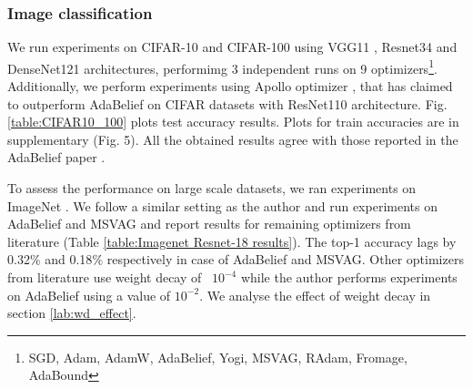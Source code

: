 
\subsubsection{Image classification}
\label{lab:Image_classification}
We run experiments on CIFAR-10 and CIFAR-100 using VGG11 \cite{VGG}, Resnet34 \cite{Resnet} and DenseNet121 \cite{Densenet} architectures, performimg 3 independent runs on 9 optimizers\footnote{\label{fnote:optim_list}SGD, Adam, AdamW, AdaBelief, Yogi, MSVAG, RAdam, Fromage, AdaBound}. Additionally, we perform experiments using Apollo optimizer \cite{Apollo}, that has claimed to outperform AdaBelief on CIFAR datasets with ResNet110 architecture. Fig. \ref{table:CIFAR10_100} plots test accuracy results. Plots for train accuracies are in supplementary (Fig. 5). All the obtained results agree with those reported in the AdaBelief paper \cite{zhuang_adabelief_2020}. 

To assess the performance on large scale datasets, we ran experiments on ImageNet \cite{Imagenet}. We follow a similar setting as the author and run experiments on AdaBelief \cite{zhuang_adabelief_2020} and MSVAG \cite{MSVAG} and report results for remaining optimizers from literature (Table \ref{table:Imagenet Resnet-18 results}). The top-1 accuracy lags by 0.32$\%$ and 0.18$\%$ respectively in case of AdaBelief and MSVAG. 
Other optimizers from literature use weight decay of ~$10^{-4}$ while the author performs experiments on AdaBelief using a value of $10^{-2}$. We analyse the effect of weight decay in section \ref{lab:wd_effect}.




